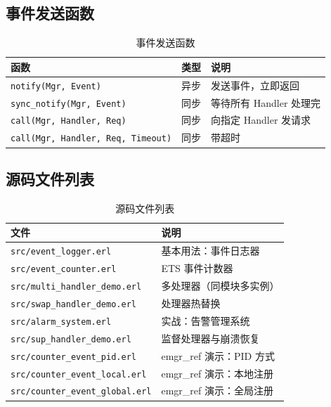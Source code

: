 \documentclass[a4paper,11pt]{article}
\begin{document}
\subsection{事件发送函数}

\begin{table}[H]
\centering
\begin{tabular}{@{}lll@{}}
\toprule
\textbf{函数} & \textbf{类型} & \textbf{说明} \\
\midrule
\texttt{notify(Mgr, Event)} & 异步 & 发送事件，立即返回 \\
\texttt{sync\_notify(Mgr, Event)} & 同步 & 等待所有 Handler 处理完 \\
\texttt{call(Mgr, Handler, Req)} & 同步 & 向指定 Handler 发请求 \\
\texttt{call(Mgr, Handler, Req, Timeout)} & 同步 & 带超时 \\
\bottomrule
\end{tabular}
\caption{事件发送函数}
\end{table}

\subsection{源码文件列表}

\begin{table}[H]
\centering
\begin{tabular}{@{}ll@{}}
\toprule
\textbf{文件} & \textbf{说明} \\
\midrule
\texttt{src/event\_logger.erl} & 基本用法：事件日志器 \\
\texttt{src/event\_counter.erl} & ETS 事件计数器 \\
\texttt{src/multi\_handler\_demo.erl} & 多处理器（同模块多实例） \\
\texttt{src/swap\_handler\_demo.erl} & 处理器热替换 \\
\texttt{src/alarm\_system.erl} & 实战：告警管理系统 \\
\texttt{src/sup\_handler\_demo.erl} & 监督处理器与崩溃恢复 \\
\texttt{src/counter\_event\_pid.erl} & emgr\_ref 演示：PID 方式 \\
\texttt{src/counter\_event\_local.erl} & emgr\_ref 演示：本地注册 \\
\texttt{src/counter\_event\_global.erl} & emgr\_ref 演示：全局注册 \\
\bottomrule
\end{tabular}
\caption{源码文件列表}
\end{table}
\end{document}
